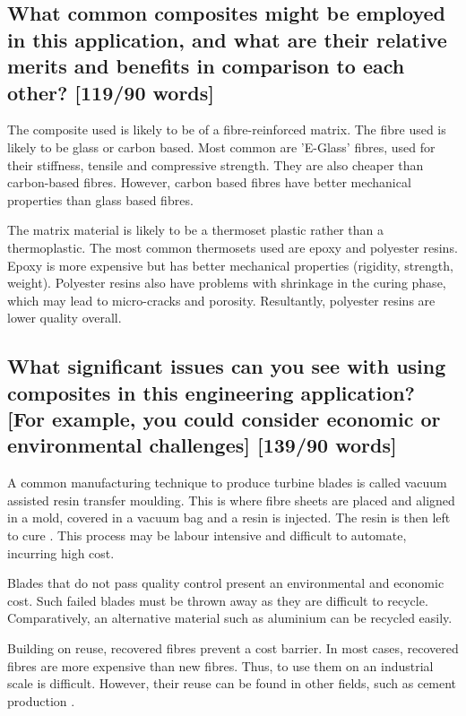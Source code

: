 \documentclass[12pt]{article}
\numberwithin{equation}{section}
\begin{document}
\begin{flushleft}
\subsection[Common composites and their relative advantages.]{What common composites might be employed in this application, and what are their relative merits and benefits in comparison to each other? [119/90 words]}
The composite used is likely to be of a fibre-reinforced matrix. The fibre used is likely to be glass or carbon based. Most common are 'E-Glass' fibres, used for their stiffness, tensile and compressive strength. They are also cheaper than carbon-based fibres. However, carbon based fibres have better mechanical properties than glass based fibres. 

The matrix material is likely to be a thermoset plastic rather than a thermoplastic. The most common thermosets used are epoxy and polyester resins. Epoxy is more expensive but has better mechanical properties (rigidity, strength, weight). Polyester resins also have problems with shrinkage in the curing phase, which may lead to micro-cracks and porosity. Resultantly, polyester resins are lower quality overall.

\subsection[Issues with composites.]{What significant issues can you see with using composites in this engineering application? [For 
example, you could consider economic or environmental
challenges] [139/90 words]}
A common manufacturing technique to produce turbine blades is called vacuum assisted resin transfer moulding. This is where fibre sheets are placed and aligned in a mold, covered in a vacuum bag and a resin is injected. The resin is then left to cure \citep{VARTM}. This process may be labour intensive and difficult to automate, incurring high cost. 

Blades that do not pass quality control present an environmental and economic cost. Such failed blades must be thrown away as they are difficult to recycle. Comparatively, an alternative material such as aluminium can be recycled easily. 

Building on reuse, recovered fibres prevent a cost barrier. In most cases, recovered fibres are more expensive than new fibres. Thus, to use them on an industrial scale is difficult. However, their reuse can be found in other fields, such as cement production \citep{fiberCement}.


\end{flushleft}
\end{document}
